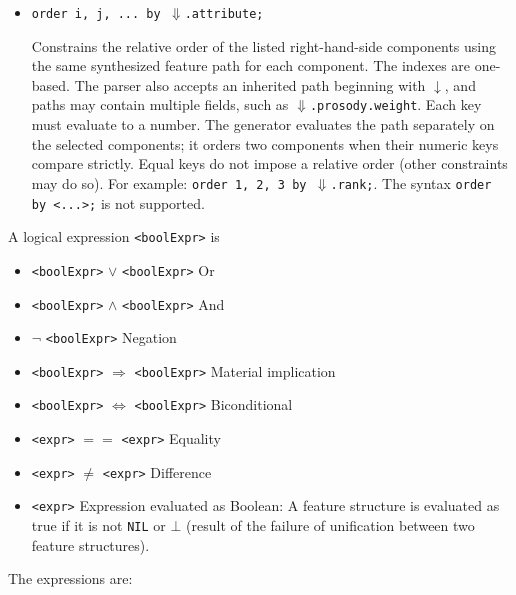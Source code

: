 \documentclass[11pt]{article}
\begin{document}
\begin{itemize}
\begin{itemize}
		      \item \verb#order i, j, ... by #$\Downarrow$\verb#.attribute;#

		            Constrains the relative order of the listed right-hand-side
		            components using the same synthesized feature path for each
		            component. The indexes are one-based. The parser also accepts
		            an inherited path beginning with $\downarrow$, and paths may
		            contain multiple fields, such as $\Downarrow$\verb#.prosody.weight#.
		            Each key must evaluate to a number. The generator evaluates
		            the path separately on the selected components; it orders two
		            components when their numeric keys compare strictly. Equal
		            keys do not impose a relative order (other constraints may do so).
		            For example: \verb#order 1, 2, 3 by #$\Downarrow$\verb#.rank;#.
		            The syntax \verb#order by <...>;# is not supported.


	      \end{itemize}

	      A logical expression \verb#<boolExpr># is

	      \begin{itemize}
		      \item \verb#<boolExpr>#  $\lor$ \verb#<boolExpr># Or
		      \item \verb#<boolExpr>#  $\land$ \verb#<boolExpr># And
		      \item $\neg$ \verb#<boolExpr># Negation
		      \item \verb#<boolExpr>#  $\Rightarrow$ \verb#<boolExpr>#
		            Material implication
		      \item \verb#<boolExpr>#  $\Leftrightarrow$ \verb#<boolExpr>#
		            Biconditional
		      \item \verb#<expr>#  $==$ \verb#<expr># Equality
		      \item \verb#<expr>#  $\neq$ \verb#<expr># Difference
		      \item \verb#<expr># Expression evaluated as Boolean: A
		            feature structure is evaluated as true if it is not
		            \verb#NIL# or $\bot$ (result of the failure of unification
		            between two feature structures).
	      \end{itemize}

	      The expressions are:


\end{itemize}
\end{document}
